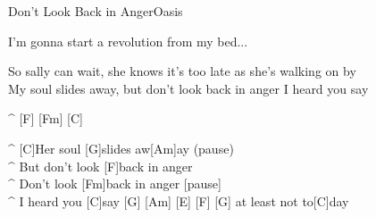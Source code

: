 \begin{song}{Don't Look Back in Anger}{Oasis}
\begin{guitar}
I'm gonna start a revolution from my bed...\\
\end{guitar}

\medskip
{}
\begin{guitar}
So sally can wait, she knows it's too late as she's walking on by\\
My soul slides away, but don't look back in anger I heard you say\\
\end{guitar}

\begin{guitar}
^ [F] [Fm] [C]\\
\end{guitar}


\medskip
{}

\medskip
\begin{guitar}
^ [C]Her soul [G]slides aw[Am]ay   (pause)\\
^ But don't look [F]back in anger\\
^ Don't look [Fm]back in anger  [pause]\\
^ I heard you [C]say  [G]    [Am]     [E]    [F]    [G]  at least not to[C]day\\
\end{guitar}
\end{song}
